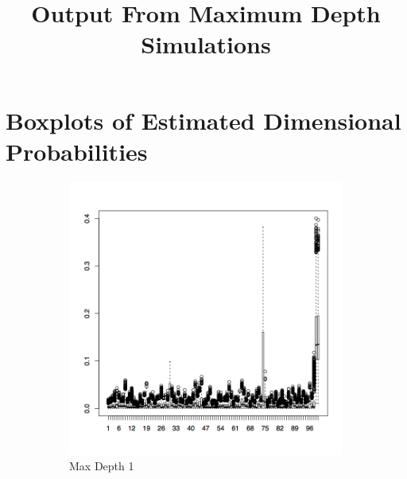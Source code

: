 \documentclass{article}
\title{Output From Maximum Depth Simulations}
\begin{document}
\maketitle

\section{Boxplots of Estimated Dimensional Probabilities}


\begin{figure}[H]
        \centering
        \begin{subfigure}[b]{0.3\textwidth}
                \centering
                \includegraphics[width=\textwidth]{c1_boxp}
                \caption{Max Depth 1}
                \label{fig:gull}
        \end{subfigure}%
        ~ %
        \begin{subfigure}[b]{0.3\textwidth}
                \centering

\end{subfigure}
\end{figure}
\end{document}
